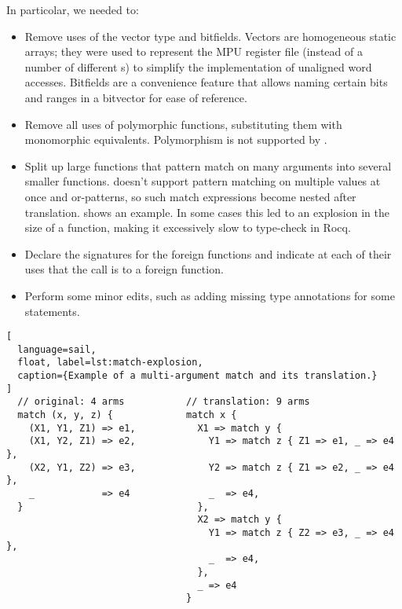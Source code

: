 In particolar, we needed to:
\begin{itemize}
\item Remove uses of the vector type and bitfields. Vectors are homogeneous static arrays; they were used to represent the MPU register file (instead of a number of different s) to simplify the implementation of unaligned word accesses. Bitfields are a convenience feature that allows naming certain bits and ranges in a bitvector for ease of reference.

\item Remove all uses of polymorphic functions, substituting them with monomorphic equivalents. Polymorphism is not supported by \usail.

\item Split up large functions that pattern match on many arguments into several smaller functions. \usail doesn't support pattern matching on multiple values at once and or-patterns, so such match expressions become nested after translation.  shows an example. In some cases this led to an explosion in the size of a \usail function, making it excessively slow to type-check in Rocq.

\item Declare the signatures for the foreign functions and indicate at each of their uses that the call is to a foreign function.

\item Perform some minor edits, such as adding missing type annotations for some statements.
\end{itemize}

\begin{lstlisting}[
  language=sail,
  float, label=lst:match-explosion,
  caption={Example of a multi-argument match and its translation.}
]
  // original: 4 arms           // translation: 9 arms
  match (x, y, z) {             match x {
    (X1, Y1, Z1) => e1,           X1 => match y {
    (X1, Y2, Z1) => e2,             Y1 => match z { Z1 => e1, _ => e4 },
    (X2, Y1, Z2) => e3,             Y2 => match z { Z1 => e2, _ => e4 },
    _            => e4              _  => e4,
  }                               },
                                  X2 => match y {
                                    Y1 => match z { Z2 => e3, _ => e4 },
                                    _  => e4,
                                  },
                                  _ => e4
                                }
\end{lstlisting}

